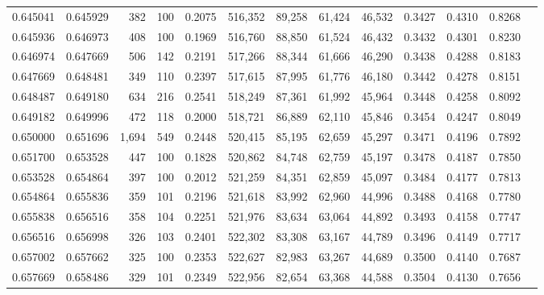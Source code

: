 \begin{tabular}{rrrrrrrrrrrrr}
0.645041 & 0.645929 &   382 & 100 &                                     0.2075 & 516,352 &  89,258 &  61,424 &  46,532 & 0.3427 & 0.4310 & 0.8268 \\
0.645936 & 0.646973 &   408 & 100 &                                     0.1969 & 516,760 &  88,850 &  61,524 &  46,432 & 0.3432 & 0.4301 & 0.8230 \\
0.646974 & 0.647669 &   506 & 142 &                                     0.2191 & 517,266 &  88,344 &  61,666 &  46,290 & 0.3438 & 0.4288 & 0.8183 \\
0.647669 & 0.648481 &   349 & 110 &                                     0.2397 & 517,615 &  87,995 &  61,776 &  46,180 & 0.3442 & 0.4278 & 0.8151 \\
0.648487 & 0.649180 &   634 & 216 &                                     0.2541 & 518,249 &  87,361 &  61,992 &  45,964 & 0.3448 & 0.4258 & 0.8092 \\
0.649182 & 0.649996 &   472 & 118 &                                     0.2000 & 518,721 &  86,889 &  62,110 &  45,846 & 0.3454 & 0.4247 & 0.8049 \\
0.650000 & 0.651696 & 1,694 & 549 &                                     0.2448 & 520,415 &  85,195 &  62,659 &  45,297 & 0.3471 & 0.4196 & 0.7892 \\
0.651700 & 0.653528 &   447 & 100 &                                     0.1828 & 520,862 &  84,748 &  62,759 &  45,197 & 0.3478 & 0.4187 & 0.7850 \\
0.653528 & 0.654864 &   397 & 100 &                                     0.2012 & 521,259 &  84,351 &  62,859 &  45,097 & 0.3484 & 0.4177 & 0.7813 \\
0.654864 & 0.655836 &   359 & 101 &                                     0.2196 & 521,618 &  83,992 &  62,960 &  44,996 & 0.3488 & 0.4168 & 0.7780 \\
0.655838 & 0.656516 &   358 & 104 &                                     0.2251 & 521,976 &  83,634 &  63,064 &  44,892 & 0.3493 & 0.4158 & 0.7747 \\
0.656516 & 0.656998 &   326 & 103 &                                     0.2401 & 522,302 &  83,308 &  63,167 &  44,789 & 0.3496 & 0.4149 & 0.7717 \\
0.657002 & 0.657662 &   325 & 100 &                                     0.2353 & 522,627 &  82,983 &  63,267 &  44,689 & 0.3500 & 0.4140 & 0.7687 \\
0.657669 & 0.658486 &   329 & 101 &                                     0.2349 & 522,956 &  82,654 &  63,368 &  44,588 & 0.3504 & 0.4130 & 0.7656 \\

\end{tabular}
